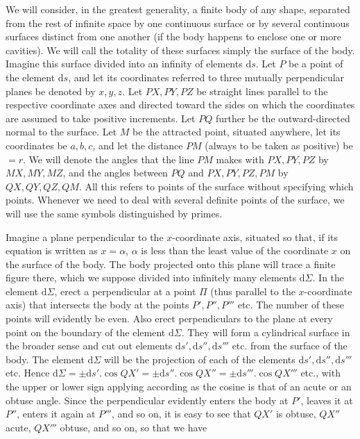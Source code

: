 \par
We will consider, in the greatest generality, a finite body of any shape, separated from the rest of infinite space by one continuous surface or by several continuous surfaces distinct from one another (if the body happens to enclose one or more cavities). We will call the totality of these surfaces simply the surface of the body. Imagine this surface divided into an infinity of elements $\mathrm{d}s$. Let $P$ be a point of the element $\mathrm{d}s$, and let its coordinates referred to three mutually perpendicular planes be denoted by $x,y,z$. Let $PX,PY,PZ$ be straight lines parallel to the respective coordinate axes and directed toward the sides on which the coordinates are assumed to take positive increments. Let $PQ$ further be the outward-directed normal to the surface. Let $M$ be the attracted point, situated anywhere, let its coordinates be $a,b,c$, and let the distance $PM$ (always to be taken as positive) be $=r$. We will denote the angles that the line $PM$ makes with $PX,PY,PZ$ by $MX,MY,MZ$, and the angles between $PQ$ and $PX,PY,PZ,PM$ by $QX,QY,QZ,QM$. All this refers to points of the surface without specifying which points. Whenever we need to deal with several definite points of the surface, we will use the same symbols distinguished by primes.

\par
Imagine a plane perpendicular to the $x$-coordinate axis, situated so that, if its equation is written as $x=\alpha$, $\alpha$ is less than the least value of the coordinate $x$ on the surface of the body. The body projected onto this plane will trace a finite figure there, which we suppose divided into infinitely many elements $\mathrm{d}\Sigma$. In the element $\mathrm{d}\Sigma$, erect a perpendicular at a point $\Pi$ (thus parallel to the $x$-coordinate axis) that intersects the body at the points $P',P'',P'''$ etc. The number of these points will evidently be even. Also erect perpendiculars to the plane at every point on the boundary of the element $\mathrm{d}\Sigma$. They will form a cylindrical surface in the broader sense and cut out elements $\mathrm{d}s',\mathrm{d}s'',\mathrm{d}s'''$ etc. from the surface of the body. The element $\mathrm{d}\Sigma$ will be the projection of each of the elements $\mathrm{d}s',\mathrm{d}s'',\mathrm{d}s'''$ etc. Hence $\mathrm{d}\Sigma=\pm\mathrm{d}s'.\cos QX'=\pm\mathrm{d}s''.\cos QX''=\pm\mathrm{d}s'''.\cos QX'''$ etc., with the upper or lower sign applying according as the cosine is that of an acute or an obtuse angle. Since the perpendicular evidently enters the body at $P'$, leaves it at $P''$, enters it again at $P'''$, and so on, it is easy to see that $QX'$ is obtuse, $QX''$ acute, $QX'''$ obtuse, and so on, so that we have
